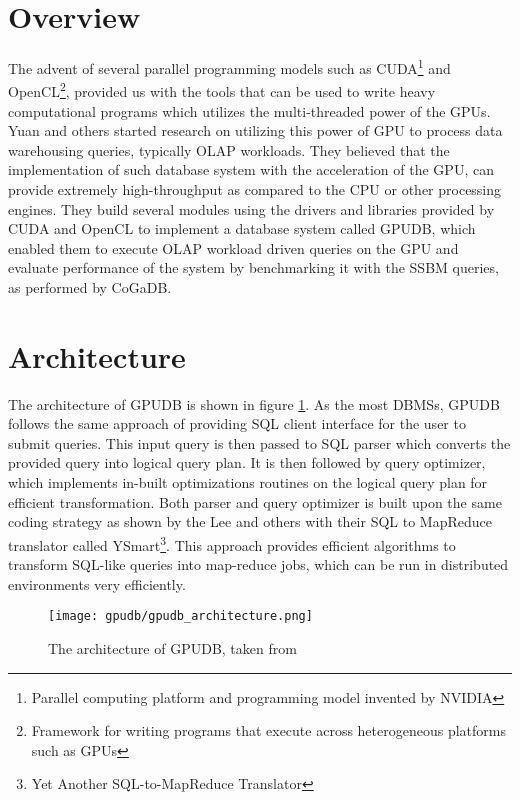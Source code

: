 \section*{Overview}
The advent of several parallel programming models such as CUDA\footnote{Parallel computing platform and programming model invented by NVIDIA} and OpenCL\footnote{Framework for writing programs that execute across heterogeneous platforms such as GPUs}, provided us with the tools that can be used to write heavy computational programs which utilizes the multi-threaded power of the GPUs. Yuan and others started research on utilizing this power of GPU to process data warehousing queries, typically OLAP workloads. They believed that the implementation of such database system with the acceleration of the GPU, can provide extremely high-throughput as compared to the CPU or other processing engines.
\newline
They build several modules using the drivers and libraries provided by CUDA and OpenCL to implement a database system called GPUDB\cite{gpudb_design_impl}, which enabled them to execute OLAP workload driven queries on the GPU and evaluate performance of the system by benchmarking it with the SSBM queries, as performed by CoGaDB.

\section*{Architecture}
The architecture of GPUDB is shown in figure \ref{fig:gpudbarch}. As the most DBMSs, GPUDB follows the same approach of providing SQL client interface for the user to submit queries. This input query is then passed to SQL parser which converts the provided query into logical query plan. It is then followed by query optimizer, which implements in-built optimizations routines on the logical query plan for efficient transformation. Both parser and query optimizer is built upon the same coding strategy as shown by the Lee and others with their SQL to MapReduce translator called YSmart\footnote{Yet Another SQL-to-MapReduce Translator}. This approach provides efficient algorithms to transform SQL-like queries into map-reduce jobs, which can be run in distributed environments very efficiently.

\begin{figure}[ht]
\texttt{[image: gpudb/gpudb\_architecture.png]}
\caption{The architecture of GPUDB, taken from \cite{gpudb_design_impl}}
\label{fig:gpudbarch}
\end{figure}

